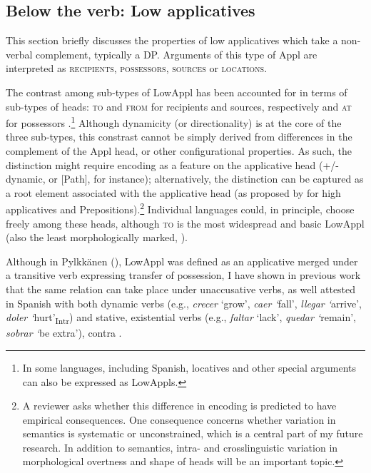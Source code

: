 \documentclass[output=paper,colorlinks,citecolor=brown,modfonts,nonflat]{langsci/langscibook}
\begin{document}
\subsection{Below the verb: Low applicatives}\label{sec:cuervo:4.1}

This section briefly discusses the properties of low applicatives which take a non-verbal complement, typically a DP. Arguments of this type of Appl are interpreted as \textsc{recipients}, \textsc{possessors}, \textsc{sources} or \textsc{locations}.

The contrast among sub-types of LowAppl has been accounted for in terms of sub-types of heads: \textsc{to} and \textsc{from} for recipients and sources, respectively \citep{Pylkkänen2008} and \textsc{at} for possessors \citep{Cuervo2003}.\footnote{In some languages, including Spanish, locatives and other special arguments can also be expressed as LowAppls.} Although dynamicity (or directionality) is at the core of the three sub-types, this constrast cannot be simply derived from differences in the complement of the Appl head, or other configurational properties.  As such, the distinction might require encoding as a feature on the applicative head (+/- dynamic, or [Path], for instance); alternatively, the distinction can be captured as a root element associated with the applicative head (as proposed by \citealt{WoodMarantz2017} for high applicatives and Prepositions).\footnote{A reviewer asks whether this difference in encoding is predicted to have empirical consequences. One consequence concerns whether variation in semantics is systematic or unconstrained, which is a central part of my future research. In addition to semantics, intra- and crosslinguistic variation in morphological overtness and shape of heads will be an important topic.} Individual languages could, in principle, choose freely among these heads, although \textsc{to} is the most widespread and basic LowAppl (also the least morphologically marked, \citealt{Cuervo2015Chapter}).

Although in Pylkkänen (\citeyear{Pylkkänen2002,Pylkkänen2008}), LowAppl was defined as an applicative merged under a transitive verb expressing transfer of possession, I have shown in previous work that the same relation can take place under unaccusative verbs, as well attested in Spanish with both dynamic verbs (e.g., \textit{crecer} ‘grow’, \textit{caer ‘}fall’, \textit{llegar ‘}arrive’, \textit{doler ‘}hurt’\textsubscript{Intr}) and stative, existential verbs (e.g., \textit{faltar} ‘lack’, \textit{quedar ‘}remain’, \textit{sobrar ‘}be extra’), contra \citet{Baker1996}.
\end{document}
